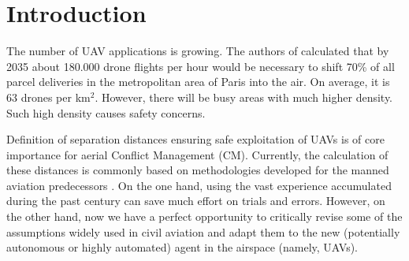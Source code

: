 \documentclass[10pt,conference]{IEEEtran}
\begin{document}
\begin{abstract}
As the number of Unmanned Aerial Vehicles (UAVs) in the airspace grows, ensuring that the aircraft do not collide becomes vital for further technology development. In this work, we propose a new UAV Near Mid-Air collision (uNMAC) safety volume taking into account i) Airframe size, ii) Localization precision, iii) UAV speed/velocity, and iv) wireless technology capabilities. Based on uNMAC, we demonstrate that inter-UAV separation distances can be reduced by using UAV-to-UAV (U2U) communication while the safety levels remain unchanged. Moreover, this work shows that next-generation Remote ID messages should contain additional information (i.e., estimated localization error and, for some applications, movement direction). As frequent broadcasting of Remote ID can further reduce the separation distances, we identified 5G NR Sidelink, Wi-Fi, and Bluetooth as suitable candidates for U2U communication.
\end{abstract}


\section{Introduction}
The number of UAV applications is growing. 
The authors of \cite{urban_density18} calculated that by 2035 about 180.000 drone flights per hour would be necessary to shift 70\% of all parcel deliveries in the metropolitan area of Paris into the air. 
On average, it is 63 drones per km$^2$. 
However, there will be busy areas with much higher density.
Such high density causes safety concerns.


Definition of separation distances ensuring safe exploitation of UAVs is of core importance for aerial Conflict Management (CM). Currently, the calculation of these distances is commonly based on methodologies developed for the manned aviation predecessors \cite{Assure,Weinert16,Cook15,Weinert18,Bubbles21}. On the one hand, using the vast experience accumulated during the past century can save much effort on trials and errors. However, on the other hand, now we have a perfect opportunity to critically revise some of the assumptions widely used in civil aviation and adapt them to the new (potentially autonomous or highly automated) agent in the airspace (namely, UAVs).  
\end{document}
